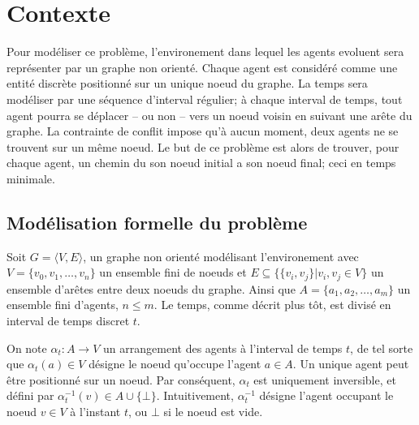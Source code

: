 \documentclass[french, 10pt, letterpaper]{article}
\theoremstyle{definition}
\theoremstyle{proposition}
\theoremstyle{example}
\begin{document}
    \newpage
    \section{Contexte}

    Pour modéliser ce problème, l'environement dans lequel les agents evoluent sera représenter par un graphe non orienté. 
    Chaque agent est considéré comme une entité discrète positionné sur un unique noeud du graphe.
    La temps sera modéliser par une séquence d'interval régulier; à chaque interval de temps, 
    tout agent pourra se déplacer -- ou non -- vers un noeud voisin en suivant une arête du graphe.
    La contrainte de conflit impose qu'à aucun moment, deux agents ne se trouvent sur un même noeud.
    Le but de ce problème est alors de trouver, pour chaque agent, un chemin du son noeud initial a son noeud final;
    ceci en temps minimale. 

    \subsection{Modélisation formelle du problème}

    Soit $G = \langle V, E \rangle$, un graphe non orienté modélisant l'environement avec $V = \{v_0, v_1, \dots, v_n\}$ un ensemble fini de noeuds et 
    $E \subseteq \{\{v_i, v_j\}|v_i, v_j \in V\}$ un ensemble d'arêtes entre deux noeuds du graphe. 
    Ainsi que $A = \{a_1, a_2, \ldots, a_m\}$ un ensemble fini d'agents, $n \leq m$. 
    Le temps, comme décrit plus tôt, est divisé en interval de temps discret $t$.

    On note $\alpha_t : A \rightarrow V$ un arrangement des agents à l'interval de temps $t$, 
    de tel sorte que $\alpha_t(a)\in V$ désigne le noeud qu'occupe l'agent $a \in A$. 
    Un unique agent peut être positionné sur un noeud.
    Par conséquent, $\alpha_t$ est uniquement inversible, et défini par $\alpha^{-1}_t(v) \in A \cup \{\bot\}$.
    Intuitivement, $\alpha^{-1}_t$ désigne l'agent occupant le noeud $v \in V$ à l'instant $t$, ou $\bot$ si le noeud est vide.
\end{document}

